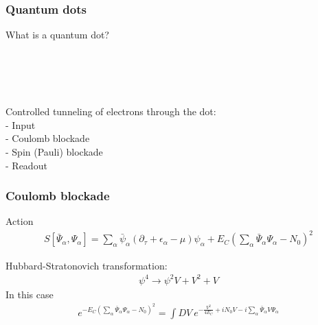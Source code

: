 \documentclass[]{beamer}
\begin{document}
\begin{frame}[t]\frametitle{Quantum dots}

What is a quantum dot?\\
~\\

~\\
~\\
~\\
Controlled tunneling of electrons through the dot:\\
- Input\\
- Coulomb blockade\\
- Spin (Pauli) blockade\\
- Readout

\end{frame}


\begin{frame}[t]\frametitle{Coulomb blockade}
Action
\begin{align*}
S[\bar{\Psi}_{\alpha}, \Psi_{\alpha}] = \sum_{\alpha} \bar{\psi}_{\alpha} (\partial_{\tau} + \epsilon_{\alpha} - \mu) \psi_{\alpha}
 + E_C (\sum_{\alpha} \bar{\Psi}_{\alpha} \Psi_{\alpha} - N_0)^2
\end{align*}

Hubbard-Stratonovich transformation:
\begin{align*}
\psi^4 \to \psi^2 V + V^2 + V
\end{align*}
In this case
\begin{align*}
e^{-E_C (\sum_{\alpha} \bar{\Psi}_{\alpha} \Psi_{\alpha} - N_0)^2 }
  = \int DV ~ e^{-\frac{V^2}{4 E_C} + i N_0 V - i \sum_{\alpha} \bar{\Psi}_{\alpha} V \Psi_{\alpha}}
\end{align*}
\end{frame}
\end{document}
